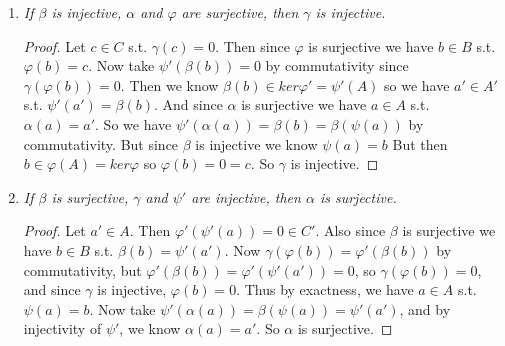 \documentclass[12pt]{amsbook}
\theoremstyle{plain}
\numberwithin{section}{chapter}
\numberwithin{equation}{chapter}
\theoremstyle{definition}
\theoremstyle{remark}
\renewcommand{\phi}{\varphi}
\begin{document}
\begin{enumerate}[label=\arabic*.]
\begin{enumerate}
\begin{proof}
Let $b' \in B$. Then $\phi'(b') \in C'$. So there exists $c \in C$ s.t. $\gamma(c) = \phi'(b')$ since $\gamma$ is surjective and there exists $b \in B$ s.t. $\phi(b) = c$ since $\phi$ is surjective. So we know $\gamma(\phi(b)) = \phi'(\beta(b)) = \phi'(b')$. So $\phi'(\beta(b) - b') = 0$, so $\beta(b) - b' \in ker\phi' = \psi'(A')$. So we know there exists $a' \in A'$ s.t. $\psi'(a') = \beta(b) - b'$. But since $\alpha$ is surjective and $a' \in A'$, we know there exists $a \in A$ s.t. $\psi'(\alpha(a)) = \psi'(a') = \beta(b) - b'$. So we must have that $\beta(\psi(a)) = \beta(b) - b'$ by commutativity. For $b-\psi(a)$ we then have $\beta(b-\psi(a))=\beta(b)-\beta(b)+b'=b'$, which proves that $\beta$ is surjective.
\end{proof}

\item \textit{If $\beta$ is injective, $\alpha$ and $\phi$ are surjective, then $\gamma$ is injective. }

\begin{proof}
Let $c \in C$ s.t. $\gamma(c) = 0$. Then since $\phi$ is surjective we have $b \in B$ s.t. $\phi(b) = c$. Now take $\psi'(\beta(b)) = 0$ by commutativity since $\gamma(\phi(b)) = 0$. Then we know $\beta(b) \in ker\phi' = \psi'(A)$ so we have $a' \in A'$ s.t. $\psi'(a') = \beta(b)$. And since $\alpha$ is surjective we have $a \in A$ s.t. $\alpha(a)  = a'$. So we have $\psi'(\alpha(a)) = \beta(b) = \beta(\psi(a))$ by commutativity. But since $\beta$ is injective we know $\psi(a) = b$ But then $b \in \phi(A) = ker\phi$ so $\phi(b) = 0 = c$. So $\gamma$ is injective. 
\end{proof}

\item \textit{If $\beta$ is surjective, $\gamma$ and $\psi'$ are injective, then $\alpha$ is surjective. }

\begin{proof}
Let $a' \in A$. Then $\phi'(\psi'(a)) = 0 \in C'$. Also since $\beta$ is surjective we have $b \in B$ s.t. $\beta(b) = \psi'(a')$. Now $\gamma(\phi(b)) = \phi'(\beta(b))$ by commutativity, but $\phi'(\beta(b)) = \phi'(\psi'(a')) = 0$, so $\gamma(\phi(b)) = 0$, and since $\gamma$ is injective, $\phi(b) = 0$. Thus by exactness, we have $a \in A$ s.t. $\psi(a) = b$. Now take $\psi'(\alpha(a)) = \beta(\psi(a)) = \psi'(a')$, and by injectivity of $\psi'$, we know $\alpha(a) = a'$. So $\alpha$ is surjective. 
\end{proof}
\end{enumerate}

\end{enumerate}
\end{document}
